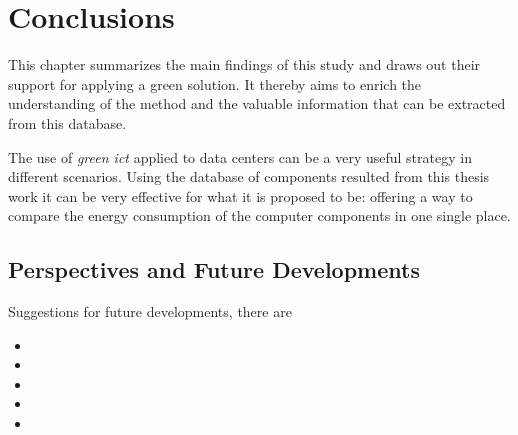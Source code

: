 

\chapter{Conclusions} \label{conclusion}




    This chapter summarizes the main findings of this study and draws out their support for applying a green solution. It thereby aims to enrich the understanding of the method and the valuable information that can be extracted from this database. 
    
    The use of \emph{green ict} applied to data centers can be a very useful strategy in different scenarios. Using the database of components resulted from this thesis work it can be very effective for what it is proposed to be: offering a way to compare the energy consumption of the computer components in one single place.
    

\section*{Perspectives and Future Developments}
Suggestions for future developments, there are

\begin{itemize}
	\item %
	\item %
	\item %
	\item %
	\item %
\end{itemize}
